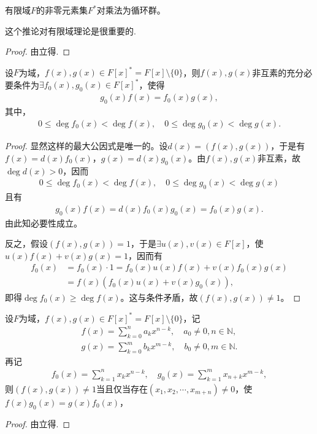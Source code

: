 \documentclass[../../main.tex]{subfiles}%
\begin{document}
\begin{corollary}\label{corollary:抽象代数--推论2.6.4}
有限域$F$的非零元素集$F^*$对乘法为循环群。
\end{corollary}
\begin{remark}
这个推论对有限域理论是很重要的.
\end{remark}
\begin{proof}

由立得.

\end{proof}

\begin{theorem}\label{theorem:抽象代数--定理2.6.3}
设$F$为域，$f(x),g(x)\in F[x]^*=F[x]\setminus \{0\}$，则$f(x),g(x)$非互素的充分必要条件为$\exists f_0(x),g_0(x)\in F[x]^*$，使得
\begin{align*}
g_0(x)f(x)=f_0(x)g(x),
\end{align*}
其中，
\begin{align*}
0\leqslant\deg f_0(x)<\deg f(x),\quad 0\leqslant\deg g_0(x)<\deg g(x).
\end{align*}
\end{theorem}
\begin{proof}

显然这样的最大公因式是唯一的。设$d(x)=(f(x),g(x))$，于是有$f(x)=d(x)f_0(x)$，$g(x)=d(x)g_0(x)$。由$f(x),g(x)$非互素，故$\deg d(x)>0$，因而
\begin{align*}
0\leqslant\deg f_0(x)<\deg f(x),\quad 0\leqslant\deg g_0(x)<\deg g(x)
\end{align*}
且有
\begin{align*}
g_0(x)f(x)=d(x)f_0(x)g_0(x)=f_0(x)g(x).
\end{align*}
由此知必要性成立。

反之，假设$(f(x),g(x))=1$，于是$\exists u(x),v(x)\in F[x]$，使$u(x)f(x)+v(x)g(x)=1$，因而有
\begin{align*}
f_0(x)&=f_0(x)\cdot1=f_0(x)u(x)f(x)+v(x)f_0(x)g(x) \\
&=f(x)(f_0(x)u(x)+v(x)g_0(x)),
\end{align*}
即得$\deg f_0(x)\geqslant\deg f(x)$。这与条件矛盾，故$(f(x),g(x))\neq1$。

\end{proof}

\begin{corollary}\label{corollary:抽象代数----定理2.6.3-推论}
设$F$为域，$f(x),g(x)\in F[x]^*=F[x]\setminus \{0\}$，记
\begin{align*}
f(x)=\sum_{k=0}^n a_kx^{n-k},\quad a_0\neq0,n\in\mathbb{N}, \\
g(x)=\sum_{k=0}^m b_kx^{m-k},\quad b_0\neq0,m\in\mathbb{N}.
\end{align*}
再记
\begin{align*}
f_0(x)=\sum_{k=1}^n x_kx^{n-k},\quad g_0(x)=\sum_{k=1}^m x_{n+k}x^{m-k},
\end{align*}
则$(f(x),g(x))\neq1$当且仅当存在$(x_1,x_2,\cdots,x_{m+n})\neq0$，使$f(x)g_0(x)=g(x)f_0(x)$，
\end{corollary}
\begin{proof}

由立得.

\end{proof}
\end{document}
